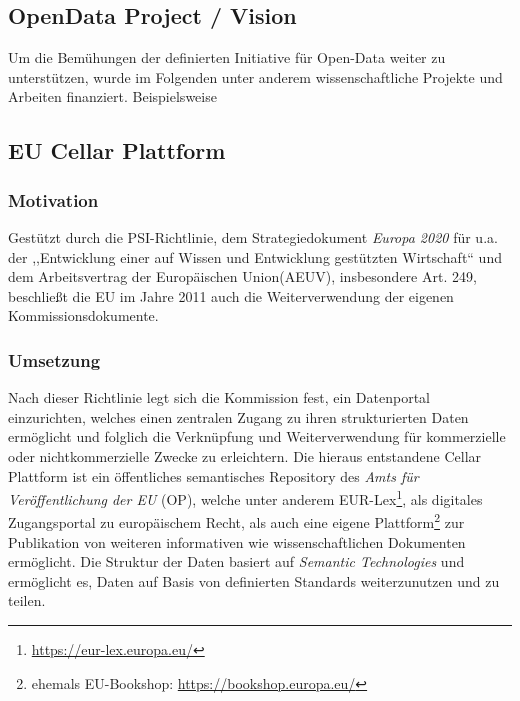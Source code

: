         
        \subsection{OpenData Project / Vision}

Um die Bemühungen der definierten Initiative für Open-Data weiter zu unterstützen, wurde im Folgenden unter anderem wissenschaftliche Projekte und Arbeiten finanziert.
Beispielsweise 



        
        \pagebreak
        \subsection{EU Cellar Plattform}

        \subsubsection{Motivation}
        
Gestützt durch die PSI-Richtlinie, dem Strategiedokument \textit{Europa 2020} für u.a. der ,,Entwicklung einer auf Wissen und Entwicklung gestützten Wirtschaft`` und dem Arbeitsvertrag der Europäischen Union(AEUV), insbesondere Art. 249, beschließt die EU im Jahre 2011 auch die Weiterverwendung der eigenen Kommissionsdokumente.\cite[Prä. 1]{2011D0833}

        \subsubsection{Umsetzung}

Nach dieser Richtlinie legt sich die Kommission fest, ein Datenportal einzurichten, welches einen zentralen Zugang zu ihren strukturierten Daten ermöglicht und folglich die Verknüpfung und Weiterverwendung für kommerzielle oder nichtkommerzielle Zwecke zu erleichtern. \cite[Art. 5]{2011D0833}
Die hieraus entstandene Cellar Plattform ist ein öffentliches semantisches Repository des \textit{Amts für Veröffentlichung der EU} (OP), welche unter anderem EUR-Lex\footnote{\href{https://eur-lex.europa.eu/homepage.html?locale=de}{https://eur-lex.europa.eu/}}, als digitales Zugangsportal zu europäischem Recht, als auch eine eigene Plattform\footnote{ehemals EU-Bookshop: \href{https://bookshop.europa.eu/}{https://bookshop.europa.eu/}} zur Publikation von weiteren informativen wie wissenschaftlichen Dokumenten ermöglicht.
Die Struktur der Daten basiert auf \textit{Semantic Technologies} und ermöglicht es, Daten auf Basis von definierten Standards weiterzunutzen und zu teilen. 
\cite[5]{eu_cellar}

